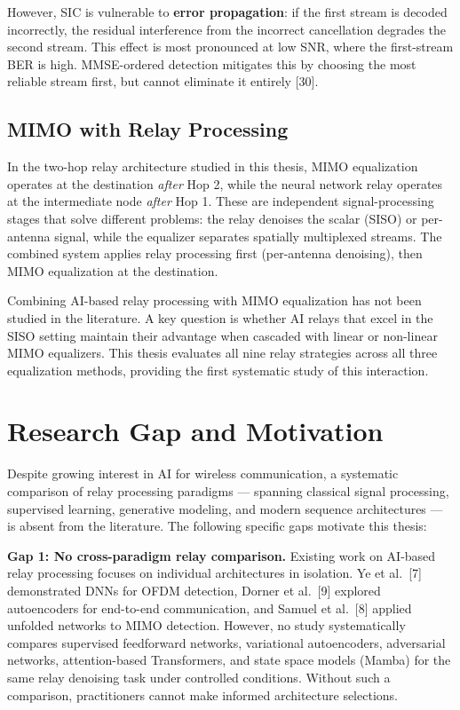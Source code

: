 \documentclass[
  english,
  12pt,
  12pt,
  a4paper,
  oneside]{report}
\begin{document}
However, SIC is vulnerable to \textbf{error propagation}: if the first stream is decoded incorrectly, the residual interference from the incorrect cancellation degrades the second stream. This effect is most pronounced at low SNR, where the first-stream BER is high. MMSE-ordered detection mitigates this by choosing the most reliable stream first, but cannot eliminate it entirely {[}30{]}.

\subsection{MIMO with Relay Processing}\label{sec:mimo-with-relay-processing}

In the two-hop relay architecture studied in this thesis, MIMO equalization operates at the destination \emph{after} Hop 2, while the neural network relay operates at the intermediate node \emph{after} Hop 1. These are independent signal-processing stages that solve different problems: the relay denoises the scalar (SISO) or per-antenna signal, while the equalizer separates spatially multiplexed streams. The combined system applies relay processing first (per-antenna denoising), then MIMO equalization at the destination.

Combining AI-based relay processing with MIMO equalization has not been studied in the literature. A key question is whether AI relays that excel in the SISO setting maintain their advantage when cascaded with linear or non-linear MIMO equalizers. This thesis evaluates all nine relay strategies across all three equalization methods, providing the first systematic study of this interaction.

\section{Research Gap and Motivation}\label{sec:research-gap-and-motivation}

Despite growing interest in AI for wireless communication, a systematic comparison of relay processing paradigms --- spanning classical signal processing, supervised learning, generative modeling, and modern sequence architectures --- is absent from the literature. The following specific gaps motivate this thesis:

\textbf{Gap 1: No cross-paradigm relay comparison.} Existing work on AI-based relay processing focuses on individual architectures in isolation. Ye et al.~{[}7{]} demonstrated DNNs for OFDM detection, Dorner et al.~{[}9{]} explored autoencoders for end-to-end communication, and Samuel et al.~{[}8{]} applied unfolded networks to MIMO detection. However, no study systematically compares supervised feedforward networks, variational autoencoders, adversarial networks, attention-based Transformers, and state space models (Mamba) for the same relay denoising task under controlled conditions. Without such a comparison, practitioners cannot make informed architecture selections.
\end{document}
